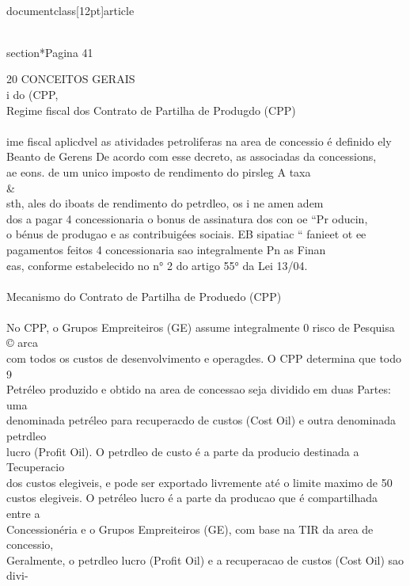 \\documentclass[12pt]{article}
\begin{document}
\\section*{Pagina 41}

20 CONCEITOS GERAIS\\
i do (CPP,\\
Regime fiscal dos Contrato de Partilha de Produgdo (CPP)\\
\\
ime fiscal aplicdvel as atividades petroliferas na area de concessio é definido ely\\
Beanto de Gerens De acordo com esse decreto, as associadas da concessions, \\%
ae eons. de um unico imposto de rendimento do pirsleg A taxa \\&\\
sth, ales do iboats de rendimento do petrdleo, os i ne amen adem\\
dos a pagar 4 concessionaria o bonus de assinatura dos con oe “Pr oducin,\\
o bénus de produgao e as contribuigées sociais. EB sipatiac “ fanieet ot ee\\
pagamentos feitos 4 concessionaria sao integralmente Pn as Finan\\
¢as, conforme estabelecido no n° 2 do artigo 55° da Lei 13/04.\\
\\
Mecanismo do Contrato de Partilha de Produ¢do (CPP)\\
\\
No CPP, o Grupos Empreiteiros (GE) assume integralmente 0 risco de Pesquisa © arca\\
com todos os custos de desenvolvimento e operagdes. O CPP determina que todo 9\\
Petréleo produzido e obtido na area de concessao seja dividido em duas Partes: uma\\
denominada petréleo para recuperacdo de custos (Cost Oil) e outra denominada petrdleo\\
lucro (Profit Oil). O petrdleo de custo é a parte da producio destinada a Tecuperacio\\
dos custos elegiveis, e pode ser exportado livremente até o limite maximo de 50\\%
custos elegiveis. O petréleo lucro é a parte da producao que é compartilhada entre a\\
Concessionéria e o Grupos Empreiteiros (GE), com base na TIR da area de concessio,\\
Geralmente, o petrdleo lucro (Profit Oil) e a recuperacao de custos (Cost Oil) sao divi-\\
\end{document}
